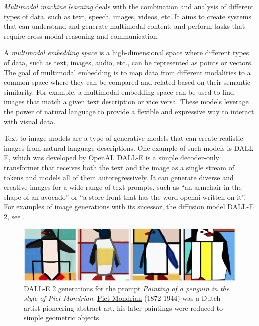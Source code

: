 \documentclass[11pt, a4paper]{amsart}
\begin{document}
\emph{Multimodal machine learning} deals with the combination and analysis of different types of data, such as text, speech, images, videos, etc. It aims to create systems that can understand and generate multimodal content, and perform tasks that require cross-modal reasoning and communication.

A \emph{multimodal embedding space} is a high-dimensional space where different types of data, such as text, images, audio, etc., can be represented as points or vectors.
The goal of multimodal embedding is to map data from different modalities to a common space where they can be compared and related based on their semantic similarity.
For example, a multimodal embedding space can be used to find images that match a given text description or vice versa.
These models leverage the power of natural language to provide a flexible and expressive way to interact with visual data.

Text-to-image models are a type of generative models that can create realistic images from natural language descriptions.
One example of such models is DALL-E, which was developed by OpenAI.
DALL-E is a simple decoder-only transformer that receives both the text and the image as a single stream of tokens and models all of them autoregressively.
It can generate diverse and creative images for a wide range of text prompts, such as ``an armchair in the shape of an avocado'' or ``a store front that has the word openai written on it''.
For examples of image generations with its sucessor, the diffusion model DALL-E 2, see .

\begin{figure}
	\centering
	\includegraphics[width=\linewidth]{figures/text_to_image/DALLE2 Painting of a penguin in the style of Piet Mondrian.png}
	\caption{
		DALL-E 2 generations for the prompt \emph{Painting of a penguin in the style of Piet Mondrian}.
		\href{https://en.wikipedia.org/wiki/Piet_Mondrian}{Piet Mondrian} (1872-1944) was a Dutch artist pioneering abstract art, his later paintings were reduced to simple geometric objects.
	}
	\label{fig:DALLE2_penguin_piet_mondrian}
\end{figure}
\end{document}
